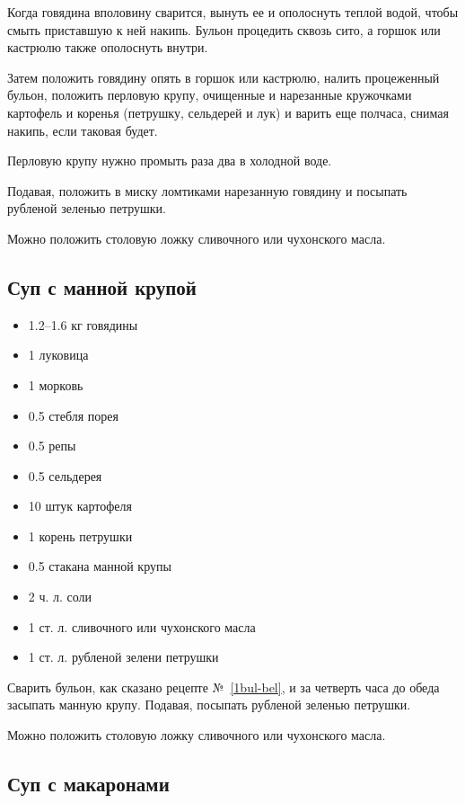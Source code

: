 Когда говядина вполовину сварится, вынуть ее и ополоснуть теплой водой, чтобы смыть приставшую к ней накипь. Бульон процедить сквозь сито, а горшок или кастрюлю также ополоснуть внутри.

Затем положить говядину опять в горшок или кастрюлю, налить процеженный бульон, положить перловую крупу, очищенные и нарезанные кружочками картофель и коренья (петрушку, сельдерей и лук) и варить еще полчаса, снимая накипь, если таковая будет.

Перловую крупу нужно промыть раза два в холодной воде.

Подавая, положить в миску ломтиками нарезанную говядину и посыпать рубленой зеленью петрушки.

Можно положить столовую ложку сливочного или чухонского масла.

\subsection{Суп с манной крупой}\label{13sup-manka}

\begin{itemize}
	\item 1.2–1.6 кг говядины 
	\item 1 луковица 
	\item 1 морковь 
	\item 0.5 стебля порея 
	\item 0.5 репы 
	\item 0.5 сельдерея 
	\item 10 штук картофеля 
	\item 1 корень петрушки 
	\item 0.5 стакана манной крупы 
	\item 2 ч. л. соли 
	\item 1 ст. л. сливочного или чухонского масла 
	\item 1 ст. л. рубленой зелени петрушки
\end{itemize}

Сварить бульон, как сказано рецепте №~\ref{1bul-bel}, и за четверть часа до обеда засыпать манную крупу. Подавая, посыпать рубленой зеленью петрушки.

Можно положить столовую ложку сливочного или чухонского масла.

\subsection{Суп с макаронами}\label{14sup-makaron}

